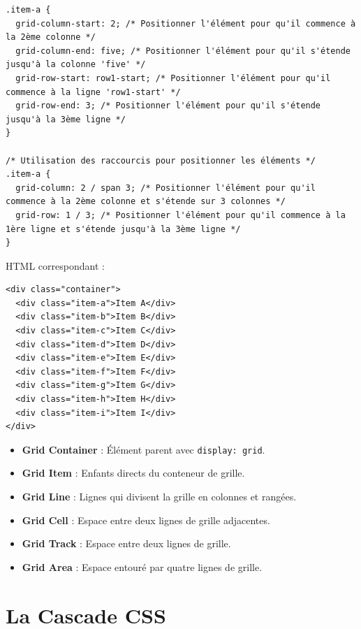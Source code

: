\documentclass{report}
\begin{document}
\begin{multicols*}{2}
\begin{lstlisting}[style=CSSDraculaLight]
.item-a {
  grid-column-start: 2; /* Positionner l'élément pour qu'il commence à la 2ème colonne */
  grid-column-end: five; /* Positionner l'élément pour qu'il s'étende jusqu'à la colonne 'five' */
  grid-row-start: row1-start; /* Positionner l'élément pour qu'il commence à la ligne 'row1-start' */
  grid-row-end: 3; /* Positionner l'élément pour qu'il s'étende jusqu'à la 3ème ligne */
}

/* Utilisation des raccourcis pour positionner les éléments */
.item-a {
  grid-column: 2 / span 3; /* Positionner l'élément pour qu'il commence à la 2ème colonne et s'étende sur 3 colonnes */
  grid-row: 1 / 3; /* Positionner l'élément pour qu'il commence à la 1ère ligne et s'étende jusqu'à la 3ème ligne */
}
\end{lstlisting}

HTML correspondant :
\begin{lstlisting}[style=HTMLDraculaDark]
<div class="container">
  <div class="item-a">Item A</div>
  <div class="item-b">Item B</div>
  <div class="item-c">Item C</div>
  <div class="item-d">Item D</div>
  <div class="item-e">Item E</div>
  <div class="item-f">Item F</div>
  <div class="item-g">Item G</div>
  <div class="item-h">Item H</div>
  <div class="item-i">Item I</div>
</div>
\end{lstlisting}

\begin{itemize}
  \item \textbf{Grid Container} : Élément parent avec \texttt{display: grid}.
  \item \textbf{Grid Item} : Enfants directs du conteneur de grille.
  \item \textbf{Grid Line} : Lignes qui divisent la grille en colonnes et rangées.
  \item \textbf{Grid Cell} : Espace entre deux lignes de grille adjacentes.
  \item \textbf{Grid Track} : Espace entre deux lignes de grille.
  \item \textbf{Grid Area} : Espace entouré par quatre lignes de grille.
\end{itemize}





\section{La Cascade CSS}


\end{multicols*}
\end{document}
